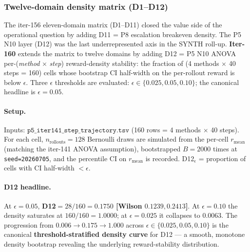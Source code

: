 %
%
%

\subsubsection{Twelve-domain density matrix (D1--D12)}
\label{sec:synth-iter160}

The iter-156 eleven-domain matrix (D1--D11) closed the value side of the
operational question by adding D11 = P8 escalation breakeven density. The
P5 N10 layer (D12) was the last underrepresented axis in the SYNTH
roll-up. \textbf{Iter-160} extends the matrix to twelve domains by adding
D12 = P5 N10 ANOVA per-(\textit{method} $\times$ \textit{step})
reward-density stability: the fraction of (4 methods $\times$ 40 steps = 160)
cells whose bootstrap CI half-width on the per-rollout reward is below
$\epsilon$. Three $\epsilon$ thresholds are evaluated:
$\epsilon \in \{0.025, 0.05, 0.10\}$; the canonical headline is
$\epsilon = 0.05$.

\paragraph{Setup.}
Inputs: $\texttt{p5\_iter141\_step\_trajectory.tsv}$ (160 rows = 4 methods
$\times$ 40 steps).  For each cell, $n_{\text{rollouts}} = 128$ Bernoulli
draws are simulated from the per-cell $r_{\text{mean}}$ (matching the
iter-141 ANOVA assumption), bootstrapped $B = 2000$ times at
\texttt{seed=20260705}, and the percentile CI on $r_{\text{mean}}$ is
recorded.  D12$_\epsilon$ = proportion of cells with CI half-width
$< \epsilon$.

\paragraph{D12 headline.} At $\epsilon = 0.05$,
\textbf{D12$ = 28/160 = 0.1750$ [Wilson $0.1239, 0.2413$]}. At
$\epsilon = 0.10$ the density saturates at
$160/160 = 1.0000$; at $\epsilon = 0.025$ it collapses to
$0.0063$. The progression from $0.006 \to 0.175 \to 1.000$ across
$\epsilon \in \{0.025, 0.05, 0.10\}$ is the canonical
\textbf{threshold-stratified density curve} for D12 --- a smooth,
monotone density bootstrap revealing the underlying reward-stability
distribution.

